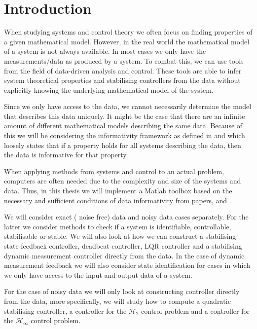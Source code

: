 
\section{Introduction}
When studying systems and control theory we often focus on finding properties of a given mathematical model. However, in the real world the mathematical model of a system is not always available. In most cases we only have the measurements/data as produced by a system. To combat this, we can use tools from the field of data-driven analysis and control. These tools are able to infer system theoretical properties and stabilising controllers from the data without explicitly knowing the underlying mathematical model of the system.

Since we only have access to the data, we cannot necessarily determine the model that describes this data uniquely. 
It might be the case that there are an infinite amount of different mathematical models describing the same data.
Because of this we will be considering the informativity framework as defined in \cite{waarde2019data} and \cite{waarde2020noisy} which loosely states that if a property holds for all systems describing the data, then the data is informative for that property.

When applying methods from systems and control to an actual problem, computers are often needed due to the complexity and size of the systems and data. Thus, in this thesis we will implement a Matlab toolbox based on the necessary and sufficient conditions of data informativity from papers, \cite{waarde2019data} and \cite{waarde2020noisy}. 

We will consider exact ( noise free) data and noisy data cases separately. For the latter we consider methods to check if a system is identifiable, controllable, stabilisable or stable. We will also look at how we can construct a stabilising state feedback controller, deadbeat controller, LQR controller and a stabilising dynamic measurement controller directly from the data. In the case of dynamic measurement feedback we will also consider state identification for cases in which we only have access to the input and output data of a system.

For the case of noisy data we will only look at constructing controller directly from the data, more specifically, we will study how to compute a quadratic stabilising controller, a controller for the $\mathcal{H}_2$ control problem and a controller for the $\mathcal{H}_\infty$ control problem.